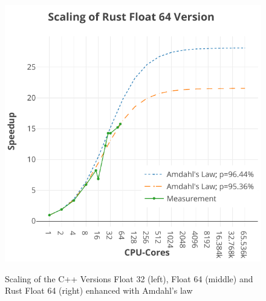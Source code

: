 \begin{landscape}
\begin{figure}[h]
{            \includegraphics[width=0.32\paperheight]{himeno/assets/himeno-rust_2-amdahls-law.pdf}
        }
        \caption{Scaling of the C++ Versions Float 32 (left), Float 64 (middle) and Rust Float 64 (right) enhanced with Amdahl's law}
        \label{fig:scaling-amdahls-law}
    \end{figure}
\end{landscape}

